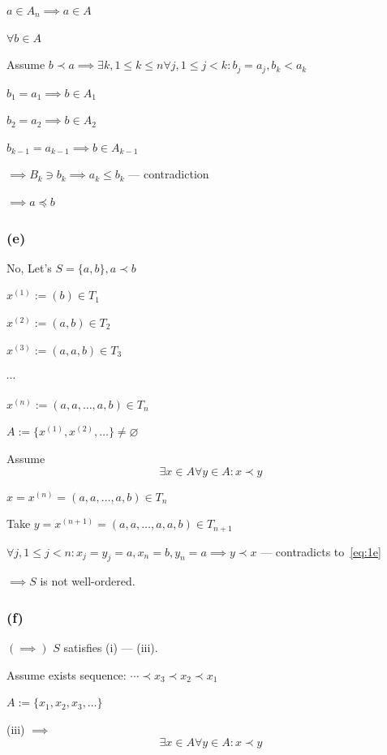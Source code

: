 \documentclass{article}
\begin{document}
\( a \in A_{n} \implies a \in A \)

\( \forall b \in A \)

Assume \( b \prec a \implies \exists k, 1 \leq k \leq n \forall j, 1\leq j < k: b_{j} = a_{j}, b_{k} < a_{k} \)

\( b_{1} = a_{1} \implies b \in A_{1} \)

\( b_{2} = a_{2} \implies b \in A_{2} \)

\( b_{k-1} = a_{k-1} \implies b \in A_{k-1} \)

\( \implies B_{k} \ni b_{k} \implies a_{k} \leq b_{k} \) --- contradiction

\( \implies a \preceq b \)

\subsubsection*{(e)}

No, Let's \( S = \{ a, b \}, a \prec b \)

\( x^{(1)} := (b) \in T_{1} \)

\( x^{(2)} := (a, b) \in T_{2} \)

\( x^{(3)} := (a, a, b) \in T_{3} \)

\( \cdots \)

\( x^{(n)} := (a,a,\ldots,a,b) \in T_{n} \)

\( A := \{ x^{(1)}, x^{(2)}, \ldots \} \neq \varnothing \)

Assume \[\exists x \in A \forall y \in A: x \prec y \tag{1}\label{eq:1e}\]

\( x = x^{(n)} = (a,a,\ldots,a,b) \in T_{n} \)

Take \( y = x^{(n+1)} = (a,a,\ldots,a,a,b) \in T_{n+1} \)

\( \forall j, 1 \leq j < n: x_{j} = y_{j} = a, x_{n} = b, y_{n} = a \implies y \prec x \) --- contradicts to~\eqref{eq:1e}

\( \implies S \) is not well-ordered.

\subsubsection*{(f)}

\( (\implies) \) \( S \) satisfies (i) --- (iii).

Assume exists sequence: \( \cdots \prec x_{3} \prec x_{2} \prec x_{1} \)

\( A := \{ x_{1}, x_{2}, x_{3}, \ldots \} \)

(iii) \( \implies \)
\[\exists x \in A \forall y \in A: x \prec y \tag{1}\label{eq:1f}\]
\end{document}
